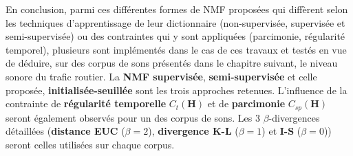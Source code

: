En conclusion, parmi ces différentes formes de NMF proposées qui diffèrent selon les techniques d'apprentissage de leur dictionnaire (non-supervisée, supervisée et semi-supervisée) ou des contraintes qui y sont appliquées (parcimonie, régularité temporel), plusieurs sont implémentés dans le cas de ces travaux et testés en vue de déduire, sur des corpus de sons présentés dans le chapitre suivant, le niveau sonore du trafic routier.
La \textbf{NMF supervisée}, \textbf{semi-supervisée} et celle proposée, \textbf{initialisée-seuillée} sont les trois approches retenues. L'influence de la contrainte de \textbf{régularité temporelle} $C_t(\mathbf{H})$ et de \textbf{parcimonie} $C_{sp}(\mathbf{H})$ seront également observés pour un des corpus de sons. Les 3 $\beta$-divergences détaillées (\textbf{distance EUC} ($\beta = 2$), \textbf{divergence K-L} ($\beta = 1$) et \textbf{I-S} ($\beta = 0$)) seront celles utilisées sur chaque corpus.


